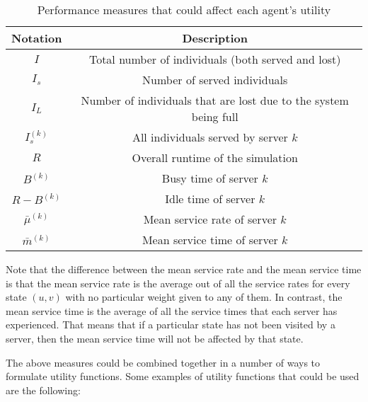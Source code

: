 \begin{table}[htbp]
    \centering
    \caption{Performance measures that could affect each agent's utility}
    \label{tab:server_agents_performance_measures}
    \begin{tabular}{|c|c|}
        \hline
        \textbf{Notation} & \textbf{Description} \\
        \hline
        \hline
        \(I\) & Total number of individuals (both served and lost) \\
        \hline
        \(I_s\) & Number of served individuals \\
        \hline
        \(I_L\) & Number of individuals that are lost due to the system being
        full \\
        \hline
        \(I_s^{(k)}\) & All individuals served by server \(k\) \\
        \hline
        \(R\) & Overall runtime of the simulation \\
        \hline
        \(B^{(k)}\) & Busy time of server \(k\) \\
        \hline
        \(R - B^{(k)}\) & Idle time of server \(k\) \\
        \hline
        \(\bar{\mu}^{(k)}\) & Mean service rate of server \(k\) \\
        \hline
        \(\bar{m}^{(k)}\) & Mean service time of server \(k\) \\
        \hline
    \end{tabular}
\end{table}

Note that the difference between the mean service rate and the mean service
time is that the mean service rate is the average out of all the service rates
for every state \((u, v)\) with no particular weight given to any of them.
In contrast, the mean service time is the average of all the service times
that each server has experienced.
That means that if a particular state has not been visited by a server, then
the mean service time will not be affected by that state.

The above measures could be combined together in a number of ways to formulate
utility functions.
Some examples of utility functions that could be used are the following:

